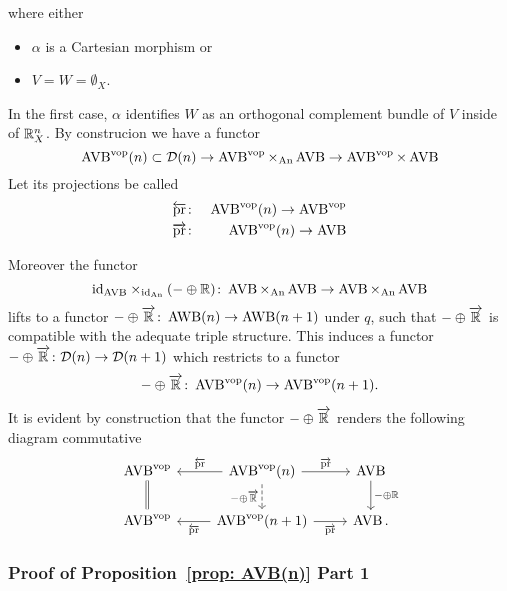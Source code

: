\begin{construction}
\[    \] where either 
    \begin{itemize}
        \item $\alpha$ is a Cartesian morphism or 
        \item $V = W = \emptyset_X$.
    \end{itemize}
    In the first case, $\alpha$ identifies $W$ as an orthogonal complement bundle of $V$ inside of 
    $\mathbb{R}^n_X$.
    By construcion we have a functor 
    \[
        \operatorname{AVB}^{\mathrm{vop}}(n) \subset \mathcal{D}(n) \to \operatorname{AVB}^{\mathrm{vop}} \times_{\operatorname{An}} \operatorname{AVB}  \to \operatorname{AVB}^{\mathrm{vop}} \times \operatorname{AVB}
    \]
    Let its projections be called 
    \begin{eqnarray*}
        \overleftarrow{\mathrm{pr}} & \colon & \operatorname{AVB}^{\mathrm{vop}}(n)  \to \operatorname{AVB}^{\mathrm{vop}} \\
        \overrightarrow{\mathrm{pr}} & \colon & \operatorname{AVB}^{\mathrm{vop}}(n)  \to  \operatorname{AVB}
    \end{eqnarray*}

    Moreover the functor 
    \[
        \mathrm{id}_{\operatorname{AVB}} \times_{\mathrm{id}_{\operatorname{An}}} (- \oplus \mathbb{R}) \colon \operatorname{AVB} \times_{\operatorname{An}} \operatorname{AVB} \to \operatorname{AVB} \times_{\operatorname{An}} \operatorname{AVB}        
    \]
    lifts to a functor $- \oplus \overrightarrow{\mathbb{R}} \colon \operatorname{AWB}(n) \to \operatorname{AWB}(n + 1)$ under $q$, 
    such that $- \oplus \overrightarrow{\mathbb{R}}$ is compatible with the adequate triple structure. 
    This induces a functor 
    $- \oplus \overrightarrow{\mathbb{R}} \colon \mathcal{D}(n) \to \mathcal{D}(n + 1)$ which restricts to a functor 
    \[
        - \oplus \overrightarrow{\mathbb{R}} \colon \operatorname{AVB}^{\mathrm{vop}}(n) \to \operatorname{AVB}^{\mathrm{vop}}(n + 1).
    \] 

\end{construction}

    It is evident by construction that the functor $-\oplus \overrightarrow{\mathbb{R}}$
    renders the following diagram commutative 
    \[\begin{tikzcd}
        {\AVB^\vop} & {\AVB^\vop(n)} & \AVB \\
        {\AVB^\vop} & {\AVB^\vop(n + 1)} & \AVB
        \arrow["{ -\oplus\overrightarrow{\R}}"', dashed, from=1-2, to=2-2]
        \arrow["{\overrightarrow{\pr}}", from=1-2, to=1-3]
        \arrow["{\overrightarrow{\pr}}"', from=2-2, to=2-3]
        \arrow["{ - \oplus \R}", from=1-3, to=2-3]
        \arrow["{\overleftarrow{\pr}}"', from=1-2, to=1-1]
        \arrow["{\overleftarrow{\pr}}", from=2-2, to=2-1]
        \arrow[Rightarrow, no head, from=1-1, to=2-1].
    \end{tikzcd}\]

\subsubsection{Proof of Proposition~\ref{prop: AVB(n)} Part 1}

